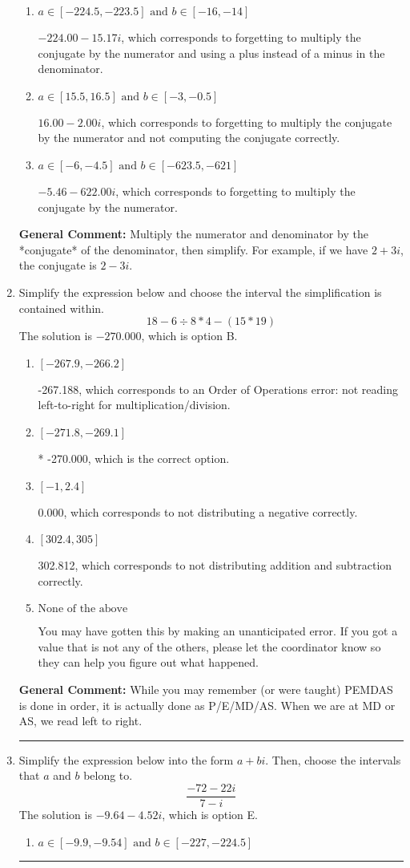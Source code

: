 \documentclass{extbook}[14pt]
\newcommand{\litem}[1]{\item #1

\rule{\textwidth}{0.4pt}}
\begin{document}
\begin{enumerate}
{\begin{enumerate}[label=\Alph*.]
* $-5.46  - 15.17 i$, which is the correct option.
\item \( a \in [-224.5, -223.5] \text{ and } b \in [-16, -14] \)

 $-224.00  - 15.17 i$, which corresponds to forgetting to multiply the conjugate by the numerator and using a plus instead of a minus in the denominator.
\item \( a \in [15.5, 16.5] \text{ and } b \in [-3, -0.5] \)

 $16.00  - 2.00 i$, which corresponds to forgetting to multiply the conjugate by the numerator and not computing the conjugate correctly.
\item \( a \in [-6, -4.5] \text{ and } b \in [-623.5, -621] \)

 $-5.46  - 622.00 i$, which corresponds to forgetting to multiply the conjugate by the numerator.
\end{enumerate}

\textbf{General Comment:} Multiply the numerator and denominator by the *conjugate* of the denominator, then simplify. For example, if we have $2+3i$, the conjugate is $2-3i$.
}
\litem{
Simplify the expression below and choose the interval the simplification is contained within.
\[ 18 - 6 \div 8 * 4 - (15 * 19) \]The solution is \( -270.000 \), which is option B.\begin{enumerate}[label=\Alph*.]
\item \( [-267.9, -266.2] \)

 -267.188, which corresponds to an Order of Operations error: not reading left-to-right for multiplication/division.
\item \( [-271.8, -269.1] \)

* -270.000, which is the correct option.
\item \( [-1, 2.4] \)

 0.000, which corresponds to not distributing a negative correctly.
\item \( [302.4, 305] \)

 302.812, which corresponds to not distributing addition and subtraction correctly.
\item \( \text{None of the above} \)

 You may have gotten this by making an unanticipated error. If you got a value that is not any of the others, please let the coordinator know so they can help you figure out what happened.
\end{enumerate}

\textbf{General Comment:} While you may remember (or were taught) PEMDAS is done in order, it is actually done as P/E/MD/AS. When we are at MD or AS, we read left to right.
}
\litem{
Simplify the expression below into the form $a+bi$. Then, choose the intervals that $a$ and $b$ belong to.
\[ \frac{-72 - 22 i}{7 - i} \]The solution is \( -9.64  - 4.52 i \), which is option E.\begin{enumerate}[label=\Alph*.]
\item \( a \in [-9.9, -9.54] \text{ and } b \in [-227, -224.5] \)


\end{enumerate}}
\end{enumerate}
\end{document}
